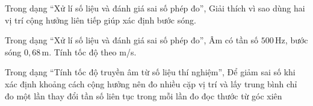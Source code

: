 \begin{ex}
Trong dạng “Xử lí số liệu và đánh giá sai số phép đo”, Giải thích vì sao dùng hai vị trí cộng hưởng liên tiếp giúp xác định bước sóng.
\choiceTF

\end{ex}

\begin{ex}
Trong dạng “Xử lí số liệu và đánh giá sai số phép đo”, Âm có tần số $500\,\text{Hz}$, bước sóng $0,68\,\text{m}$. Tính tốc độ theo m/s.
\end{ex}

\begin{ex}
Trong dạng “Tính tốc độ truyền âm từ số liệu thí nghiệm”, Để giảm sai số khi xác định khoảng cách cộng hưởng nên
\choice
{\True đo nhiều cặp vị trí và lấy trung bình}
{chỉ đo một lần}
{thay đổi tần số liên tục trong mỗi lần đo}
{đọc thước từ góc xiên}
\end{ex}


